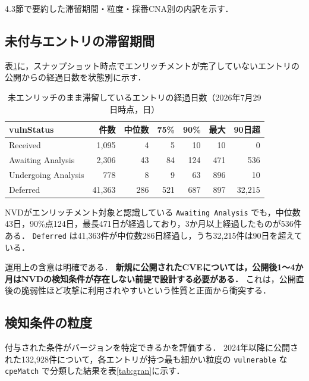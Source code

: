 4.3節で要約した滞留期間・粒度・採番CNA別の内訳を示す．

\subsection*{未付与エントリの滞留期間}

表\ref{tab:pending}に，スナップショット時点でエンリッチメントが完了していないエントリの公開からの経過日数を状態別に示す．

\begin{table}[htbp]
  \caption{未エンリッチのまま滞留しているエントリの経過日数（2026年7月29日時点，日）}
  \label{tab:pending}
  \begin{center}
  \small
  \begin{tabular}{lrrrrrr}
    \hline
    vulnStatus & 件数 & 中位数 & 75\% & 90\% & 最大 & 90日超 \\
    \hline
    Received & 1,095 & 4 & 5 & 10 & 10 & 0 \\
    Awaiting Analysis & 2,306 & 43 & 84 & 124 & 471 & 536 \\
    Undergoing Analysis & 778 & 8 & 9 & 63 & 896 & 10 \\
    Deferred & 41,363 & 286 & 521 & 687 & 897 & 32,215 \\
    \hline
  \end{tabular}
  \end{center}
\end{table}

NVDがエンリッチメント対象と認識している \texttt{Awaiting Analysis} でも，中位数43日，90\%点124日，最長471日が経過しており，3か月以上経過したものが536件ある．
\texttt{Deferred} は41,363件が中位数286日経過し，うち32,215件は90日を超えている．

運用上の含意は明確である．
\textbf{新規に公開されたCVEについては，公開後1〜4か月はNVDの検知条件が存在しない前提で設計する必要がある．}
これは，公開直後の脆弱性ほど攻撃に利用されやすいという性質と正面から衝突する．

\subsection*{検知条件の粒度}

付与された条件がバージョンを特定できるかを評価する．
2024年以降に公開された132,928件について，各エントリが持つ最も細かい粒度の \texttt{vulnerable} な \texttt{cpeMatch} で分類した結果を表\ref{tab:gran}に示す．


